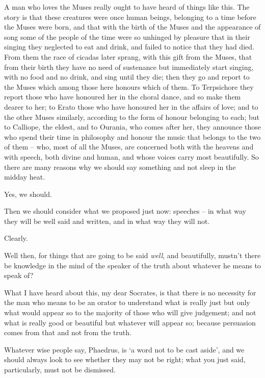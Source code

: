 A man who loves the Muses really ought to have  heard
of things like this. The story is that these creatures were once human
beings, belonging to a time before the Muses were born, and that with
the birth of the Muses and the appearance of song some of the people of
the time were so unhinged by pleasure that in their singing they
neglected to eat and drink,  and failed to notice that they had
died. From them the race of cicadas later sprang, with this gift from
the Muses, that from their birth they have no need of sustenance but
immediately start singing, with no food and no drink, and sing until
they  die; then they go and report to the Muses which among
those here honours which of them. To Terpsichore they report those who
have honoured her in the choral dance, and so make them  dearer
to her; to Erato those who have honoured her in the affairs of love; and
to the other Muses similarly, according to the form of honour belonging
to each; but to Calliope, the eldest, and to Ourania, who comes after
her, they announce those who spend their time in philosophy and honour
the music  that belongs to the two of them -- who, most of all
the Muses, are concerned both with the heavens and with
speech, both divine and
human, and whose voices carry most beautifully. So there are many
reasons why we should say something and not sleep in the midday heat.

Yes, we should.

Then we should consider what we proposed just now:
speeches -- in what way they will be well said and written, and in what
way they will not.

Clearly.

Well then, for things that are going to be said {\em well}, and
beautifully, mustn't there be knowledge in the mind of the speaker of
the truth about whatever he means to speak of?

What I have heard about this, my dear Socrates, is 
that there is no necessity for the man who means to be an orator to
understand what is really just but only what would appear so to the
majority of those who will give judgement; and not what is really good
or beautiful but whatever will appear so; because persuasion comes from
that and not from the truth.

 Whatever wise people say, Phaedrus, is ‘a word not to
be cast aside', and we
should always look to see whether they may not be right; what you just
said, particularly, must not be dismissed.

